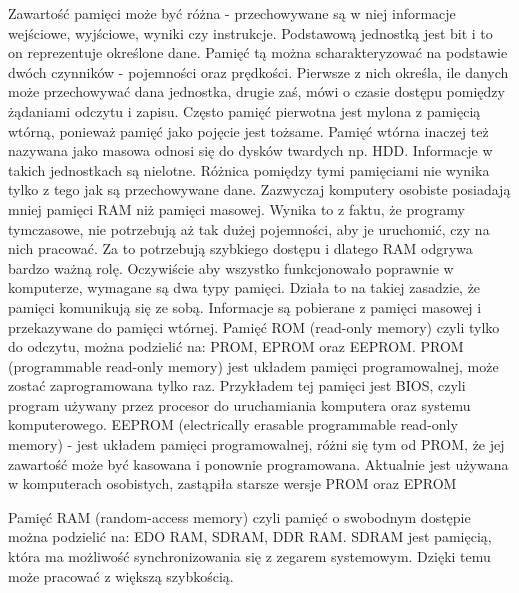 \documentclass[12pt, a4paper, onside, polish]{article}				%
\begin{document}
Zawartość pamięci może być różna - przechowywane są w niej informacje wejściowe, wyjściowe, wyniki czy instrukcje. Podstawową jednostką jest bit i to on reprezentuje określone dane. Pamięć tą można scharakteryzować na podstawie dwóch czynników - pojemności oraz prędkości. Pierwsze z nich określa, ile danych może przechowywać dana jednostka, drugie zaś, mówi o czasie dostępu pomiędzy żądaniami odczytu i zapisu. Często pamięć pierwotna jest mylona z pamięcią wtórną, ponieważ pamięć jako pojęcie jest tożsame. Pamięć wtórna inaczej też nazywana jako masowa odnosi się do dysków twardych np. HDD. Informacje w takich jednostkach są nielotne. Różnica pomiędzy tymi pamięciami nie wynika tylko z tego jak są przechowywane dane. Zazwyczaj komputery osobiste posiadają mniej pamięci RAM niż pamięci masowej. Wynika to z faktu, że programy tymczasowe, nie potrzebują aż tak dużej pojemności, aby je uruchomić, czy na nich pracować. Za to potrzebują szybkiego dostępu i dlatego RAM odgrywa bardzo ważną rolę. Oczywiście aby wszystko funkcjonowało poprawnie w komputerze, wymagane są dwa typy pamięci. Działa to na takiej zasadzie, że pamięci komunikują się ze sobą. Informacje są pobierane z pamięci masowej i przekazywane do pamięci wtórnej.  
\newline\newline
Pamięć ROM (read-only memory) czyli tylko do odczytu, można podzielić na: PROM, EPROM oraz EEPROM.  \newline\newline
PROM (programmable read-only memory) jest układem pamięci programowalnej, może zostać zaprogramowana tylko raz. Przykładem tej pamięci jest BIOS, czyli program używany przez procesor do uruchamiania komputera oraz systemu komputerowego. \newline\newline
EEPROM (electrically erasable programmable read-only memory) - jest układem pamięci programowalnej, różni się tym od PROM, że jej zawartość może być kasowana i ponownie programowana. Aktualnie jest używana w komputerach osobistych, zastąpiła starsze wersje PROM oraz EPROM \newline\newline

 
Pamięć RAM (random-access memory) czyli pamięć o swobodnym dostępie można podzielić na: EDO RAM, SDRAM, DDR RAM. \newline\newline
SDRAM jest pamięcią, która ma możliwość synchronizowania się z zegarem systemowym. Dzięki temu może pracować z większą szybkością. \newline\newline
\end{document}
